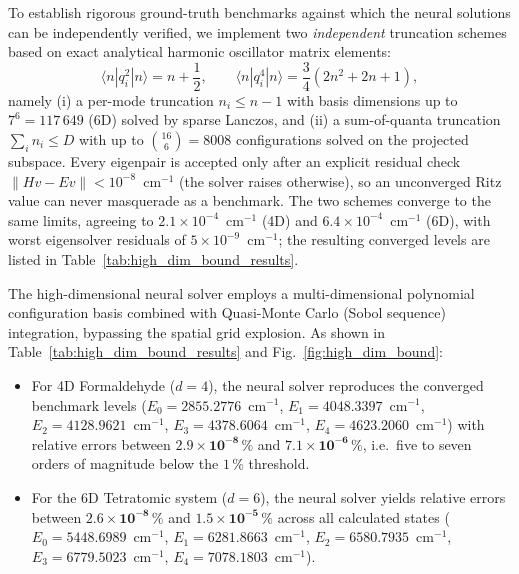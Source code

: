 \documentclass[11pt,a4paper]{article}
\newcommand{\cmi}{\ensuremath{\mathrm{cm}^{-1}}}
\begin{document}
To establish rigorous ground-truth benchmarks against which the neural solutions can be independently verified, we implement two \emph{independent} truncation schemes based on exact analytical harmonic oscillator matrix elements:
\begin{equation}
 \langle n | q_i^2 | n \rangle = n + \frac{1}{2} , \qquad
 \langle n | q_i^4 | n \rangle = \frac{3}{4}(2n^2 + 2n + 1) ,
\end{equation}
namely (i) a per-mode truncation $n_i \le n-1$ with basis dimensions up to $7^6 = 117\,649$ (6D) solved by sparse Lanczos, and (ii) a sum-of-quanta truncation $\sum_i n_i \le D$ with up to $\binom{16}{6} = 8008$ configurations solved on the projected subspace. Every eigenpair is accepted only after an explicit residual check $\|H v - E v\| < 10^{-8}$~\cmi{} (the solver raises otherwise), so an unconverged Ritz value can never masquerade as a benchmark. The two schemes converge to the same limits, agreeing to $2.1 \times 10^{-4}$~\cmi{} (4D) and $6.4 \times 10^{-4}$~\cmi{} (6D), with worst eigensolver residuals of $5 \times 10^{-9}$~\cmi; the resulting converged levels are listed in Table~\ref{tab:high_dim_bound_results}.

The high-dimensional neural solver employs a multi-dimensional polynomial configuration basis combined with Quasi-Monte Carlo (Sobol sequence) integration, bypassing the spatial grid explosion. As shown in Table~\ref{tab:high_dim_bound_results} and Fig.~\ref{fig:high_dim_bound}:
\begin{itemize}
 \item For 4D Formaldehyde ($d=4$), the neural solver reproduces the converged benchmark levels ($E_0 = 2855.2776$~\cmi, $E_1 = 4048.3397$~\cmi, $E_2 = 4128.9621$~\cmi, $E_3 = 4378.6064$~\cmi, $E_4 = 4623.2060$~\cmi) with relative errors between $\mathbf{2.9 \times 10^{-8}\,\%}$ and $\mathbf{7.1 \times 10^{-6}\,\%}$, i.e.\ five to seven orders of magnitude below the $1\,\%$ threshold.
 \item For the 6D Tetratomic system ($d=6$), the neural solver yields relative errors between $\mathbf{2.6 \times 10^{-8}\,\%}$ and $\mathbf{1.5 \times 10^{-5}\,\%}$ across all calculated states ($E_0 = 5448.6989$~\cmi, $E_1 = 6281.8663$~\cmi, $E_2 = 6580.7935$~\cmi, $E_3 = 6779.5023$~\cmi, $E_4 = 7078.1803$~\cmi).
\end{itemize}
\end{document}
